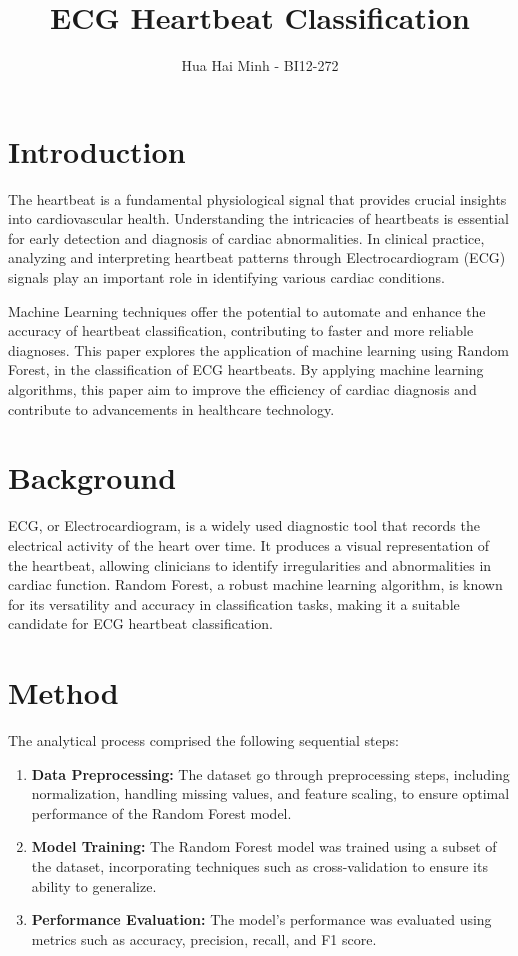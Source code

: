 \documentclass[conference]{IEEEtran}
\title{ECG Heartbeat Classification}
\author{Hua Hai Minh - BI12-272}
\begin{document}
\maketitle

\section{Introduction}

The heartbeat is a fundamental physiological signal that provides crucial insights into cardiovascular health. Understanding the intricacies of heartbeats is essential for early detection and diagnosis of cardiac abnormalities. In clinical practice, analyzing and interpreting heartbeat patterns through Electrocardiogram (ECG) signals play an important role in identifying various cardiac conditions.

Machine Learning techniques offer the potential to automate and enhance the accuracy of heartbeat classification, contributing to faster and more reliable diagnoses. This paper explores the application of machine learning using Random Forest, in the classification of ECG heartbeats. By applying machine learning algorithms, this paper aim to improve the efficiency of cardiac diagnosis and contribute to advancements in healthcare technology.

\section{Background}

ECG, or Electrocardiogram, is a widely used diagnostic tool that records the electrical activity of the heart over time. It produces a visual representation of the heartbeat, allowing clinicians to identify irregularities and abnormalities in cardiac function. Random Forest, a robust machine learning algorithm, is known for its versatility and accuracy in classification tasks, making it a suitable candidate for ECG heartbeat classification.

\section{Method}

The analytical process comprised the following sequential steps:

\begin{enumerate}
    \item \textbf{Data Preprocessing:} The dataset go through preprocessing steps, including normalization, handling missing values, and feature scaling, to ensure optimal performance of the Random Forest model.
    
    \item \textbf{Model Training:} The Random Forest model was trained using a subset of the dataset, incorporating techniques such as cross-validation to ensure its ability to generalize.
    
    \item \textbf{Performance Evaluation:} The model's performance was evaluated using metrics such as accuracy, precision, recall, and F1 score. 
\end{enumerate}
\end{document}
